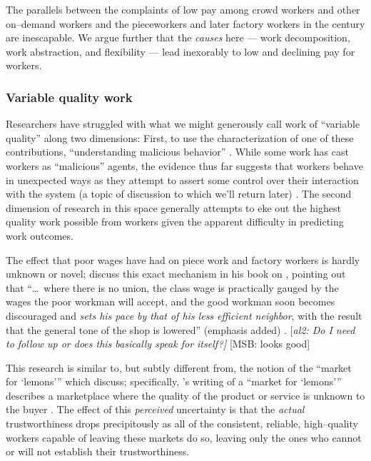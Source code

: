 \documentclass{sigchi}
\newcommand{\msb}[1]{{\color{PineGreen}[MSB: #1]}}
\newcommand{\ali}[1]{{\color{BrickRed}[\itshape al2: #1\upshape]}}
\begin{document}
The parallels between the complaints of low pay among crowd workers and other on--demand workers
and the pieceworkers and later factory workers in the  century
are inescapable.
We argue further that the \textit{causes} here
--- work decomposition,
work abstraction, and
flexibility ---
lead inexorably to low and declining pay for workers.

\subsubsection{Variable quality work}\label{sec:varQualWork}
Researchers have struggled with what we might generously call work of ``variable quality''
along two dimensions:
First, to use the characterization of one of these contributions,
``understanding malicious behavior''
\cite{MaliciousCrowdworkersGadiraju}.
While some work has cast workers as ``malicious'' agents,
the evidence thus far suggests that
workers behave in unexpected ways as they attempt to assert some control over their interaction with the system
(a topic of discussion to which we'll return later)
\cite{uberAlgorithm}.
The second dimension of research in this space generally attempts
to eke out the highest quality work possible from workers
given the apparent difficulty in predicting work outcomes.





The effect that poor wages have had on piece work and factory workers is hardly unknown or novel;
\citeauthor{gantt1913work} discuss this exact mechanism in his book on
, pointing out that
``\dots~where there is no union,
the class wage is practically gauged by the wages the poor workman will accept,
and the good workman soon becomes discouraged and \textit{sets his pace by that of his less efficient neighbor},
with the result that the general tone of the shop is lowered'' (emphasis added)
\cite{gantt1913work}.
\ali{Do I need to follow up or does this basically speak for itself?} \msb{looks good}

This research is similar to, but subtly different from, the notion of the ``market for `lemons'''
which \citeauthor{fort2011amazon} discuss;
specifically, \citeauthor{akerlof1970market}'s writing of a ``market for `lemons'''
describes a marketplace where the quality of the product or service is unknown to the buyer
\cite{fort2011amazon,akerlof1970market}.
The effect of this \textit{perceived} uncertainty is that
the \textit{actual} trustworthiness drops precipitously
as all of the consistent, reliable, high--quality workers capable of leaving these markets do so,
leaving only the ones who cannot or will not establish their trustworthiness.
\end{document}
